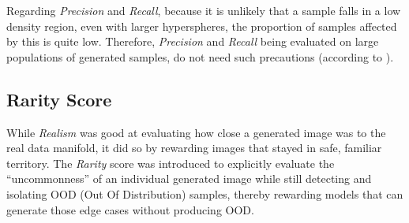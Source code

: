 Regarding \emph{Precision} and \emph{Recall}, because it is unlikely that a sample falls in a low density region, even with larger hyperspheres, the proportion of samples affected by this is quite low. Therefore, \emph{Precision} and \emph{Recall} being evaluated on large populations of generated samples, do not need such precautions (according to \cite{kynkaanniemi_improved_2019}).


 
\subsection{Rarity Score}
\label{subsec:rarity}

While \emph{Realism} was good at evaluating how close a generated image was to the real data manifold, it did so by rewarding images that stayed in safe, familiar territory.
The \emph{Rarity} score \cite{han_rarity_2022} was introduced to explicitly evaluate the ``uncommonness'' of an individual generated image while still detecting and isolating \acs{OOD} (Out Of Distribution) samples, thereby rewarding models that can generate those edge cases without producing \acs{OOD}.

